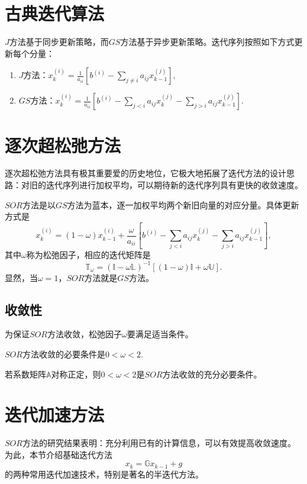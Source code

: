 \documentclass[10pt]{article}
\begin{document}
\section{古典迭代算法}
	$J$方法基于同步更新策略，而$GS$方法基于异步更新策略。迭代序列按照如下方式更新每个分量：
	\begin{enumerate}
	\item $J$方法：\indent $x_k^{(i)}=\frac{1}{a_{ii}}[b^{(i)}-\sum_{j\neq i}a_{ij}x_{k-1}^{(j)}],$
	\item $GS$方法：\indent $x_k^{(i)}=\frac{1}{a_{ii}}[b^{(i)}-\sum_{j< i}a_{ij}x_{k}^{(j)}-\sum_{j>i}a_{ij}x_{k-1}^{(j)}].$
	\end{enumerate}
\section{逐次超松弛方法}
逐次超松弛方法具有极其重要爱的历史地位，它极大地拓展了迭代方法的设计思路：对旧的迭代序列进行加权平均，可以期待新的迭代序列具有更快的收敛速度。
\begin{definition}
	$SOR$方法是以$GS$方法为蓝本，逐一加权平均两个新旧向量的对应分量。具体更新方式是
	$$x_k^{(i)}=(1-\omega)x_{k-1}^{(i)}+\frac{\omega}{a_{ii}}[b^{(i)}-\sum_{j<i}a_{ij}x_k^{(j)}-\sum_{j>i}a_{ij}x_{k-1}^{(j)}],$$其中$\omega$称为松弛因子，相应的迭代矩阵是
	\begin{equation}
	\mathbb{T}_{\omega}=(\mathbb{I}-\omega\mathbb{L})^{-1}[(1-\omega)\mathbb{I}+\omega\mathbb{U}].
	\end{equation}
	显然，当$\omega=1$，$SOR$方法就是$GS$方法。
\end{definition}
\subsection{收敛性}
为保证$SOR$方法收敛，松弛因子$\omega$要满足适当条件。
\begin{theorem}
$SOR$方法收敛的必要条件是$0<\omega<2.$
\end{theorem}
\begin{theorem}
若系数矩阵$\mathbb{A}$对称正定，则$0<\omega<2$是$SOR$方法收敛的充分必要条件。
\end{theorem}
\section{迭代加速方法}
$SOR$方法的研究结果表明：充分利用已有的计算信息，可以有效提高收敛速度。为此，本节介绍基础迭代方法
\begin{equation}
x_k=\mathbb{G}x_{k-1}+g
\end{equation}的两种常用迭代加速技术，特别是著名的半迭代方法。
\end{document}
